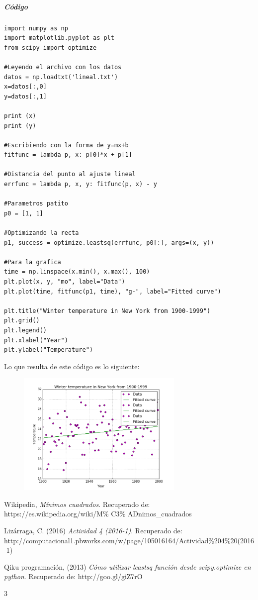 \documentclass[12pt]{article}
\begin{document}
\subparagraph{Código}
\begin{verbatim}
import numpy as np
import matplotlib.pyplot as plt
from scipy import optimize

#Leyendo el archivo con los datos
datos = np.loadtxt('lineal.txt')
x=datos[:,0]
y=datos[:,1]

print (x)
print (y)

#Escribiendo con la forma de y=mx+b
fitfunc = lambda p, x: p[0]*x + p[1]

#Distancia del punto al ajuste lineal
errfunc = lambda p, x, y: fitfunc(p, x) - y 

#Parametros patito
p0 = [1, 1] 

#Optimizando la recta
p1, success = optimize.leastsq(errfunc, p0[:], args=(x, y))

#Para la grafica
time = np.linspace(x.min(), x.max(), 100)
plt.plot(x, y, "mo", label="Data") 
plt.plot(time, fitfunc(p1, time), "g-", label="Fitted curve")

plt.title("Winter temperature in New York from 1900-1999")
plt.grid()
plt.legend()
plt.xlabel("Year")
plt.ylabel("Temperature")
\end{verbatim}
Lo que resulta de este código es lo siguiente:
\begin{figure}[H]
	\centering
	\includegraphics[width=8cm]{figure_2.png}
\end{figure}

\pagebreak

\begin{thebibliography}{3}
	
	Wikipedia,
	\emph{Mínimos cuadrados}. Recuperado de: https://es.wikipedia.org/wiki/M\% C3\% ADnimos\_cuadrados
	
	Lizárraga, C. (2016)
	\textit{Actividad 4 (2016-1)}. Recuperado de: http://computacional1.pbworks.com/w/page/105016164/Actividad\%204\%20(2016-1)
	

	Qiku programación, (2013)
	\emph{Cómo utilizar leastsq función desde scipy.optimize en python}. Recuperado de: http://goo.gl/giZ7rO

\end{thebibliography}{3}
\end{document}
